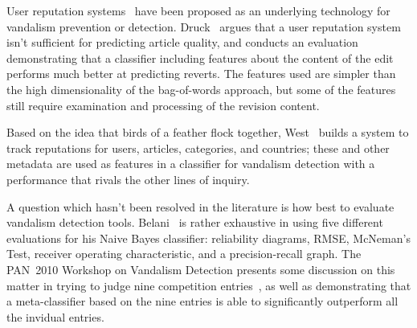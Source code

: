 User reputation systems~\cite{WikiTrust07,WikiMTWtrust07,www07}
have been proposed as an underlying technology for vandalism
prevention or detection.
Druck\etal~\cite{Druck2008} argues that a user reputation system isn't
sufficient for predicting article quality, and conducts an evaluation
demonstrating that a classifier including features about the content
of the edit performs much better at predicting reverts.
The features used are simpler than the high dimensionality of
the bag-of-words approach, but some of the features still require
examination and processing of the revision content.

Based on the idea that birds of a feather flock together,
West\etal~\cite{West2010} builds a system to track reputations
for users, articles, categories, and countries; these and other metadata
are used as features in a classifier for vandalism detection with
a performance that rivals the other lines of inquiry.


A question which hasn't been resolved in the literature is how best to
evaluate vandalism detection tools.
Belani~\cite{Belani2010} is rather exhaustive in using five different
evaluations for his Naive Bayes classifier: reliability diagrams,
RMSE, McNeman's Test, receiver operating characteristic,
and a precision-recall graph.
The PAN~2010 Workshop on Vandalism Detection presents some discussion
on this matter in trying to judge nine competition
entries~\cite{Potthast2010b}, as well as demonstrating that a
meta-classifier based on the nine entries is able to significantly
outperform all the invidual entries.



